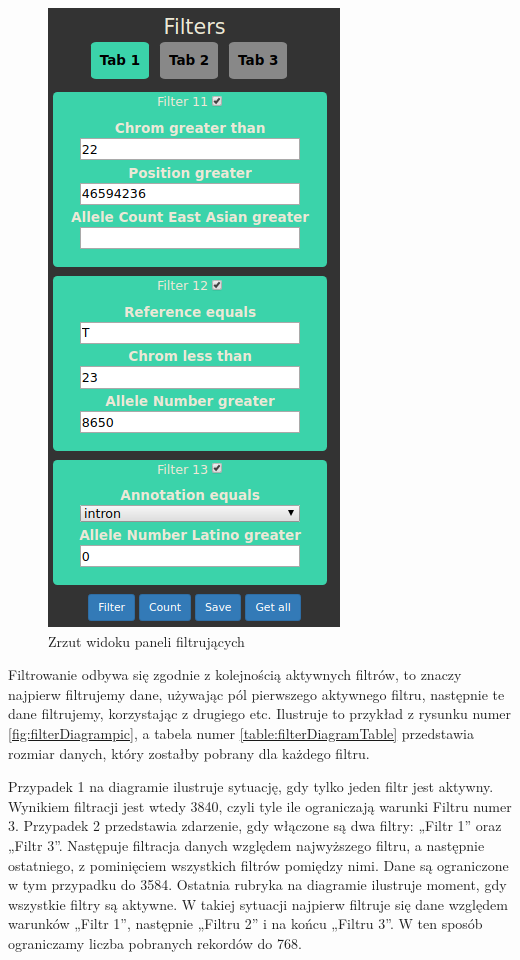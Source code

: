 \documentclass[a4paper,12pt,twoside]{article}
\begin{document}
\begin{figure}
\centering
\includegraphics[height=0.95\textheight]{obrazy/aplikacja/filters.png}
\caption{Zrzut widoku paneli filtrujących}
\label{fig:filterspic}
\end{figure}

\newpage

Filtrowanie odbywa się zgodnie z kolejnością aktywnych filtrów, to znaczy najpierw filtrujemy dane, używając pól pierwszego aktywnego filtru, następnie te dane filtrujemy, korzystając z drugiego etc. Ilustruje to przykład z rysunku numer \ref{fig:filterDiagrampic}, a tabela numer \ref{table:filterDiagramTable}
przedstawia rozmiar danych, który zostałby pobrany dla każdego filtru.

Przypadek 1 na diagramie ilustruje sytuację, gdy tylko jeden filtr jest aktywny.
Wynikiem filtracji jest wtedy 3840, czyli tyle ile ograniczają warunki Filtru numer 3.
Przypadek 2 przedstawia zdarzenie, gdy włączone są dwa filtry: „Filtr 1” oraz „Filtr 3”. Następuje filtracja danych względem najwyższego filtru, a następnie ostatniego,
z pominięciem wszystkich filtrów pomiędzy nimi.
Dane są ograniczone w tym przypadku do 3584.
Ostatnia rubryka na diagramie ilustruje moment, gdy wszystkie filtry są aktywne.
W takiej sytuacji najpierw filtruje się dane względem warunków „Filtr 1”,
następnie „Filtru 2” i na końcu „Filtru 3”. W ten sposób ograniczamy
liczba pobranych rekordów do 768.
\end{document}
